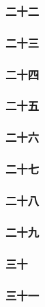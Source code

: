 \subsubsection*{二十二}




\subsubsection*{二十三}




\subsubsection*{二十四}




\subsubsection*{二十五}




\subsubsection*{二十六}




\subsubsection*{二十七}




\subsubsection*{二十八}




\subsubsection*{二十九}




\subsubsection*{三十}




\subsubsection*{三十一}




